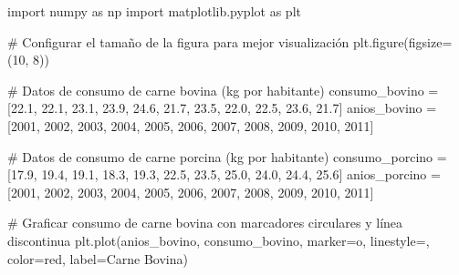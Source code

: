 \documentclass[
  jou,
  floatsintext,
  longtable,
  a4paper,
  nolmodern,
  notxfonts,
  notimes,
  colorlinks=true,linkcolor=blue,citecolor=blue,urlcolor=blue]{apa7}
\newenvironment{Shaded}{\begin{snugshade}}{\end{snugshade}}
\newcommand{\CommentTok}[1]{\textcolor[rgb]{0.37,0.37,0.37}{#1}}
\newcommand{\DecValTok}[1]{\textcolor[rgb]{0.68,0.00,0.00}{#1}}
\newcommand{\FloatTok}[1]{\textcolor[rgb]{0.68,0.00,0.00}{#1}}
\newcommand{\ImportTok}[1]{\textcolor[rgb]{0.00,0.46,0.62}{#1}}
\newcommand{\NormalTok}[1]{\textcolor[rgb]{0.00,0.23,0.31}{#1}}
\newcommand{\OperatorTok}[1]{\textcolor[rgb]{0.37,0.37,0.37}{#1}}
\newcommand{\StringTok}[1]{\textcolor[rgb]{0.13,0.47,0.30}{#1}}
\begin{document}
\begin{Shaded}
\begin{Highlighting}[]
\ImportTok{import}\NormalTok{ numpy }\ImportTok{as}\NormalTok{ np}
\ImportTok{import}\NormalTok{ matplotlib.pyplot }\ImportTok{as}\NormalTok{ plt}

\CommentTok{\# Configurar el tamaño de la figura para mejor visualización}
\NormalTok{plt.figure(figsize}\OperatorTok{=}\NormalTok{(}\DecValTok{10}\NormalTok{, }\DecValTok{8}\NormalTok{))}

\CommentTok{\# Datos de consumo de carne bovina (kg por habitante)}
\NormalTok{consumo\_bovino }\OperatorTok{=}\NormalTok{ [}\FloatTok{22.1}\NormalTok{, }\FloatTok{22.1}\NormalTok{, }\FloatTok{23.1}\NormalTok{, }\FloatTok{23.9}\NormalTok{, }\FloatTok{24.6}\NormalTok{, }\FloatTok{21.7}\NormalTok{, }\FloatTok{23.5}\NormalTok{, }\FloatTok{22.0}\NormalTok{, }\FloatTok{22.5}\NormalTok{, }\FloatTok{23.6}\NormalTok{, }\FloatTok{21.7}\NormalTok{]}
\NormalTok{anios\_bovino }\OperatorTok{=}\NormalTok{ [}\DecValTok{2001}\NormalTok{, }\DecValTok{2002}\NormalTok{, }\DecValTok{2003}\NormalTok{, }\DecValTok{2004}\NormalTok{, }\DecValTok{2005}\NormalTok{, }\DecValTok{2006}\NormalTok{, }\DecValTok{2007}\NormalTok{, }\DecValTok{2008}\NormalTok{, }\DecValTok{2009}\NormalTok{, }\DecValTok{2010}\NormalTok{, }\DecValTok{2011}\NormalTok{]}

\CommentTok{\# Datos de consumo de carne porcina (kg por habitante)}
\NormalTok{consumo\_porcino }\OperatorTok{=}\NormalTok{ [}\FloatTok{17.9}\NormalTok{, }\FloatTok{19.4}\NormalTok{, }\FloatTok{19.1}\NormalTok{, }\FloatTok{18.3}\NormalTok{, }\FloatTok{19.3}\NormalTok{, }\FloatTok{22.5}\NormalTok{, }\FloatTok{23.5}\NormalTok{, }\FloatTok{25.0}\NormalTok{, }\FloatTok{24.0}\NormalTok{, }\FloatTok{24.4}\NormalTok{, }\FloatTok{25.6}\NormalTok{]}
\NormalTok{anios\_porcino }\OperatorTok{=}\NormalTok{ [}\DecValTok{2001}\NormalTok{, }\DecValTok{2002}\NormalTok{, }\DecValTok{2003}\NormalTok{, }\DecValTok{2004}\NormalTok{, }\DecValTok{2005}\NormalTok{, }\DecValTok{2006}\NormalTok{, }\DecValTok{2007}\NormalTok{, }\DecValTok{2008}\NormalTok{, }\DecValTok{2009}\NormalTok{, }\DecValTok{2010}\NormalTok{, }\DecValTok{2011}\NormalTok{]}

\CommentTok{\# Graficar consumo de carne bovina con marcadores circulares y línea discontinua}
\NormalTok{plt.plot(anios\_bovino, consumo\_bovino, marker}\OperatorTok{=}\StringTok{\textquotesingle{}o\textquotesingle{}}\NormalTok{, linestyle}\OperatorTok{=}\StringTok{\textquotesingle{}{-}{-}\textquotesingle{}}\NormalTok{, color}\OperatorTok{=}\StringTok{\textquotesingle{}red\textquotesingle{}}\NormalTok{, label}\OperatorTok{=}\StringTok{\textquotesingle{}Carne Bovina\textquotesingle{}}\NormalTok{)}


\end{Highlighting}
\end{Shaded}
\end{document}

